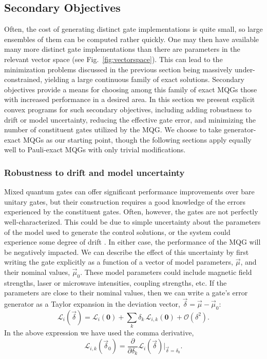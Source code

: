 \documentclass[aps,nofootinbib,pra,notitlepage,twocolumn]{revtex4-1}
\newcommand{\order}[1]{\mathcal{O}\left( #1 \right)}
\newcommand{\genmat}{\ensuremath{{\mathcal{L}}}}
\newcommand{\0}{\ensuremath{\mathbf{0}}}
\begin{document}

\subsection{Secondary Objectives}
\noindent 
Often, the cost of generating distinct gate implementations is quite small, so large ensembles of them can be computed rather quickly. One may then have available many more distinct gate implementations than there are parameters in the relevant vector space (see Fig.~\ref{fig:vectorspace}). This can lead to the minimization problems discussed in the previous section being massively under-constrained, yielding a large continuous family of exact solutions. Secondary objectives provide a means for choosing among this family of exact MQGs those with increased performance in a desired area. In this section we present explicit convex programs for such secondary objectives, including adding robustness to drift or model uncertainty, reducing the effective gate error, and minimizing the number of constituent gates utilized by the MQG. We choose to take generator-exact MQGs as our starting point, though the following sections apply equally well to Pauli-exact MQGs with only trivial modifications. 

\subsubsection{Robustness to drift and model uncertainty} %
\label{sub:adding_robustness}
\noindent 
Mixed quantum gates can offer significant performance improvements over bare unitary gates, but their construction requires a good knowledge of the errors experienced by the constituent gates. Often, however, the gates are not perfectly well-characterized. This could be due to simple uncertainty about the parameters of the model used to generate the control solutions, or the system could experience some degree of drift \cite{1907.13608}. In either case, the performance of the MQG will be negatively impacted. We can describe the effect of this uncertainty by first writing the gate explicitly as a function of a vector of model parameters, $\vec\mu$, and their nominal values, $\vec\mu_0$. These model parameters could include magnetic field strengths, laser or microwave intensities, coupling strengths, etc. If the parameters are close to their nominal values, then we can write a gate's error generator as a Taylor expansion in the deviation vector, $\vec\delta = \vec\mu-\vec\mu_0$:
\begin{equation}
	\label{eq:sensitivity_expansion}
	\genmat_i(\vec \delta) = \genmat_i(\0) + \sum_k \delta_k \,\genmat_{i,k}(\0) + \order{\delta^2}.
\end{equation} 
In the above expression we have used the comma derivative, 
\begin{equation}
	\genmat_{i,k}(\vec \delta_0) = \frac{\partial}{\partial \delta_k} \genmat_i(\vec\delta) \vert_{\vec \delta=\delta_0}.
\end{equation}
\end{document}

